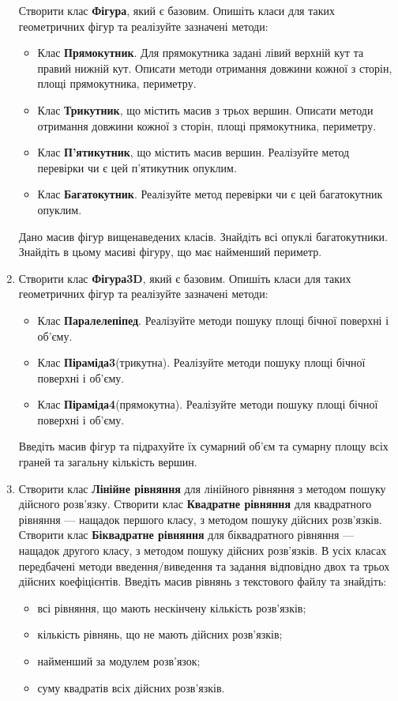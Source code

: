 \documentclass[a5paper,titlepage,openany,twoside,
]
{book_unv}%
\begin{document}
\begin{enumerate}
Створити клас \textbf{Фігура}, який є базовим.  Опишіть класи для 
таких геометричних фігур та реалізуйте зазначені методи:
\begin{itemize}
\item
Клас \textbf{Прямокутник}. 
Для прямокутника задані лівий верхній кут та правий нижній кут.
Описати методи отримання довжини кожної з сторін, площі прямокутника,
периметру. 
\item
Клас \textbf{ Трикутник}, що містить масив з трьох вершин. 
Описати методи отримання довжини кожної з сторін, площі прямокутника,
периметру. 
\item
Клас \textbf{ П'ятикутник}, що містить масив вершин. 
Реалізуйте метод перевірки чи є цей п'ятикутник опуклим.
\item
Клас \textbf{ Багатокутник}. 
Реалізуйте метод перевірки чи є цей багатокутник опуклим.
\end{itemize}
Дано масив фігур вищенаведених класів. Знайдіть всі опуклі багатокутники.
Знайдіть в цьому масиві фігуру, що має найменший периметр.

\item

Створити клас \textbf{Фігура3D}, який є базовим.  Опишіть класи для 
таких геометричних фігур та реалізуйте зазначені методи:
\begin{itemize}
\item
  Клас \textbf{Паралелепіпед}. Реалізуйте методи пошуку площі бічної поверхні і
  об'єму.
\item
  Клас \textbf{Піраміда3}(трикутна). Реалізуйте методи пошуку площі бічної поверхні і
  об'єму.
\item
  Клас \textbf{Піраміда4}(прямокутна). Реалізуйте методи пошуку площі бічної поверхні і
  об'єму.
\end{itemize}
Введіть масив фігур та підрахуйте їх сумарний об'єм та сумарну площу всіх граней 
та загальну кількість вершин.

\item
Створити клас \textbf{Лінійне рівняння} для лінійного рівняння з методом пошуку дійсного розв'язку.
Створити клас \textbf{Квадратне рівняння} для квадратного рівняння --- нащадок першого класу,
з методом пошуку дійсних розв'язків.
Створити клас \textbf{Біквадратне рівняння} для біквадратного рівняння --- нащадок другого класу,
з методом пошуку дійсних розв'язків. В усіх класах передбачені методи введення/виведення та задання 
відповідно двох та трьох дійсних коефіцієнтів.
Введіть масив рівнянь з текстового файлу та знайдіть:
\begin{itemize}
\item
всі рівняння, що мають нескінчену кількість розв'язків;
\item
кількість рівнянь, що не мають дійсних розв'язків;
\item
найменший за модулем розв'язок;
\item
суму квадратів всіх дійсних розв'язків.
\end{itemize}


\end{enumerate}
\end{document}
